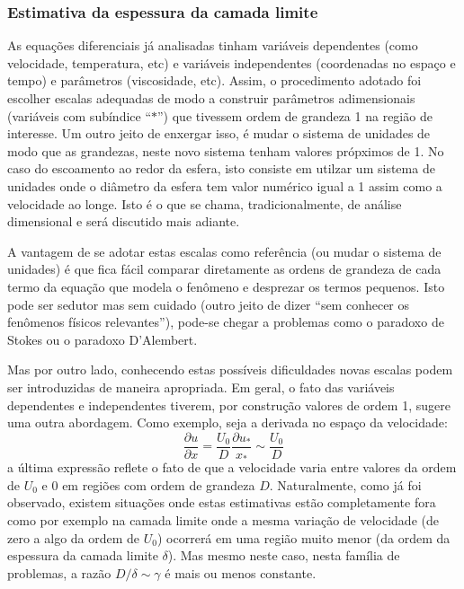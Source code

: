 \documentclass[article,12pt,oneside,a4paper,english,brazil,sumario=tradicional]{abntex2}
\begin{document}
\subsubsection{Estimativa da espessura da camada limite}
As equações diferenciais já analisadas tinham variáveis dependentes (como velocidade, temperatura, etc) e variáveis independentes (coordenadas no espaço e tempo) e parâmetros (viscosidade, etc). Assim, o procedimento adotado foi escolher escalas adequadas de modo a construir parâmetros adimensionais (variáveis com subíndice ``$*$'') que tivessem ordem de grandeza 1 na região de interesse. Um outro jeito de enxergar isso, é mudar o sistema de unidades de modo que as grandezas, neste novo sistema tenham valores própximos de 1. No caso do escoamento ao redor da esfera, isto consiste em utilzar um sistema de unidades onde o diâmetro da esfera tem valor numérico igual a 1 assim como a velocidade ao longe. Isto é o que se chama, tradicionalmente, de análise dimensional e será discutido mais adiante. 

A vantagem de se adotar estas escalas como referência (ou mudar o sistema de unidades) é que fica fácil comparar diretamente as ordens de grandeza de cada termo da equação que modela o fenômeno e desprezar  os termos pequenos. Isto pode ser sedutor mas sem cuidado (outro jeito de dizer ``sem conhecer os fenômenos físicos relevantes''), pode-se chegar a problemas como o paradoxo de Stokes ou o paradoxo D'Alembert. 

Mas por outro lado, conhecendo estas possíveis dificuldades novas escalas podem ser introduzidas de maneira apropriada. Em geral, o fato das variáveis dependentes e independentes tiverem, por construção valores de ordem 1, sugere uma outra abordagem. Como exemplo, seja a derivada no espaço da velocidade:
\[
\frac{\partial u}{\partial x} = \frac{U_0}{D}\frac{\partial u_*}{x_*} \sim \frac{U_0}{D}
\]
a última expressão reflete o fato de que a velocidade varia entre valores da ordem de $U_0$ e $0$ em regiões com ordem de grandeza $D$. Naturalmente, como já foi observado,  existem situações onde estas estimativas estão completamente fora como por exemplo na camada limite onde a mesma variação de velocidade (de zero a algo da ordem de $U_0$) ocorrerá em uma região muito menor (da ordem da espessura da camada limite $\delta$). Mas mesmo neste caso, nesta família de problemas, a razão $D/\delta\sim\gamma$ é mais ou menos constante. 
\end{document}
